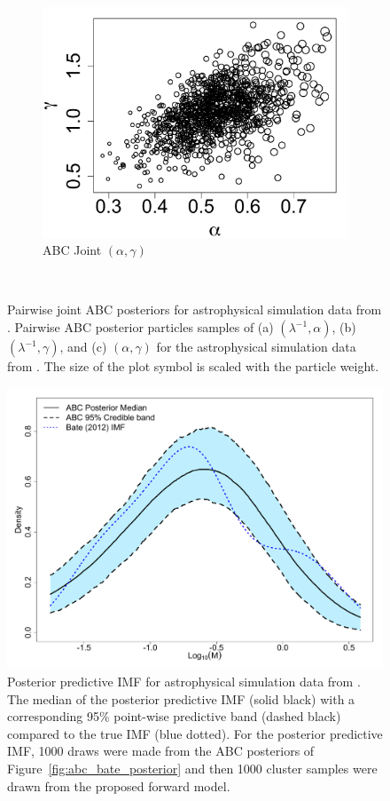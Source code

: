 \documentclass[ejs]{imsart}
\numberwithin{equation}{section}
\theoremstyle{plain}
\begin{document}
\begin{figure}[htbp]
\begin{subfigure}{0.32\textwidth}
\centering
\includegraphics[width = \textwidth]{figures/bate_joint_alpha_gamma.pdf} 
\caption{ABC Joint $(\alpha, \gamma)$}\label{subfig:joint_gamma_alpha_bate}
\end{subfigure} \\
\caption{
Pairwise joint ABC posteriors for astrophysical simulation data from \cite{Bate2012}.  Pairwise ABC posterior particles samples of (a) $(\lambda^{-1}, \alpha)$, (b) $(\lambda^{-1}, \gamma)$, and (c) $(\alpha, \gamma)$ for the astrophysical simulation data from \cite{Bate2012}.  The size of the plot symbol is scaled with the particle weight.
}
\label{fig:abc_bate_joints}
\end{figure}





\begin{figure}[htbp]
\centering
\includegraphics[width=.5\textwidth]{figures/bate_pred_imf.pdf}
 \caption{Posterior predictive IMF for astrophysical simulation data from \cite{Bate2012}. 
The median of the posterior predictive IMF (solid black) with a corresponding 95\% point-wise predictive band (dashed black) compared to the true IMF (blue dotted).  For the posterior predictive IMF, 1000 draws were made from the ABC posteriors of Figure~\ref{fig:abc_bate_posterior} and then 1000 cluster samples were drawn from the proposed forward model.  
} \label{fig:abc_bate_pred}
\end{figure}
\end{document}
